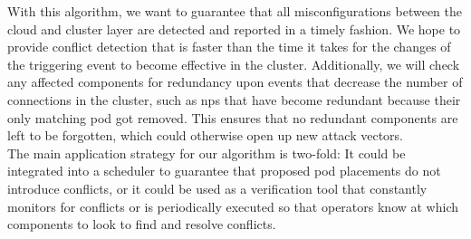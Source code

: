 With this algorithm, we want to guarantee that all misconfigurations between the cloud and cluster layer are detected and reported in a timely fashion. We hope to provide conflict detection that is faster than the time it takes for the changes of the triggering event to become effective in the cluster. Additionally, we will check any affected components for redundancy upon events that decrease the number of connections in the cluster, such as \acrshort{np}s that have become redundant because their only matching pod got removed. This ensures that no redundant components are left to be forgotten, which could otherwise open up new attack vectors.
\\[10pt]

The main application strategy for our algorithm is two-fold: It could be integrated into a scheduler to guarantee that proposed pod placements do not introduce conflicts, or it could be used as a verification tool that constantly monitors for conflicts or is periodically executed so that operators know at which components to look to find and resolve conflicts.


